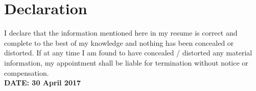 \documentclass[10pt,a4paper,sans]{moderncv} %
\begin{document}


\section{Declaration}
 I declare that the information mentioned here in my resume is correct and complete to the best of my knowledge and nothing has been concealed or distorted. 
If at any time I am found to have concealed / distorted any material information, my appointment shall be liable for termination without notice or compensation. \\


\textbf{DATE: 30 April 2017}
\end{document}
